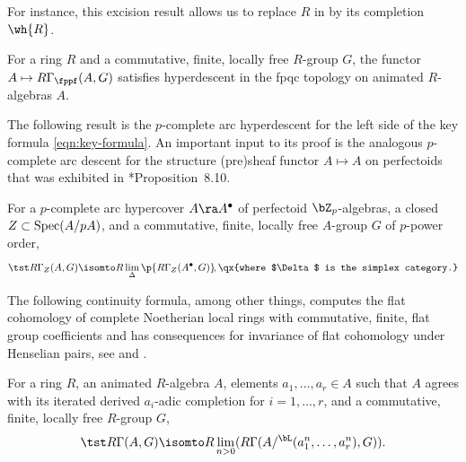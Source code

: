 For instance, this excision result allows us to replace $R$ in  by its completion $\wh{R}$.

 \label{thm:fppf-fpqc-ann}
For a ring $R$ and a commutative, finite, locally free $R$-group $G$, the functor $A \mapsto R\Gamma_\fppf(A, G)$ satisfies hyperdescent in the fpqc topology on animated $R$-algebras $A$.
\ethm

The following result is the $p$-complete arc hyperdescent for the left side of the key formula \eqref{eqn:key-formula}. An important input to its proof is the analogous $p$-complete arc descent for the structure (pre)sheaf functor $A \mapsto A$ on perfectoids that was exhibited in \cite{BS19}*{Proposition~8.10}.





 \label{thm:descent-ann}
For a $p$-complete arc hypercover $A \ra A^\bullet$  %
of perfectoid $\bZ_p$-algebras, a closed $Z \subset \operatorname{Spec}(A/pA)$, and a commutative, finite, locally free $A$-group $G$ of $p$-power order,
\[
\tst R\Gamma_Z(A, G) \isomto R\lim_{\Delta} \p{R\Gamma_Z(A^\bullet, G)}\!, \qx{where $\Delta$ is the simplex category.}
\]
\ethm



The following continuity formula, among other things, computes the flat cohomology of complete Noetherian local rings with commutative, finite, flat group coefficients and has consequences for invariance of flat cohomology under Henselian pairs, see  and .

 \label{adic-continuity-ann}
For a ring $R$, an animated $R$-algebra $A$, elements $a_1, \dotsc, a_r \in A$ such that $A$ agrees with its iterated derived $a_i$-adic completion for $i = 1, \dotsc, r$, and a commutative, finite, locally free $R$-group $G$,
\[
\tst R\Gamma(A, G) \isomto R\lim_{n > 0} (R\Gamma(A/^\bL (a_1^n, \dotsc, a_r^n), G)).
\]
\ethm




